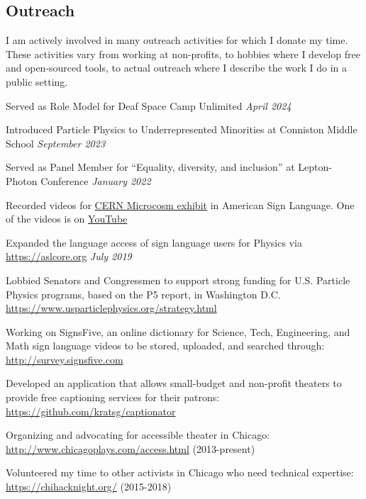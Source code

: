 \documentclass[margin,line]{resume}
\let\origsection\section%
\let\section\subsection%
\let\section\origsection%
\begin{document}
\begin{resume}
\section{\mysidestyle Outreach}
I am actively involved in many outreach activities for which I donate my time. These activities vary from working at non-profits, to hobbies where I develop free and open-sourced tools, to actual outreach where I describe the work I do in a public setting.
\begin{list2}
  \item Served as Role Model for Deaf Space Camp Unlimited \hfill \textsl{April 2024}
  \item Introduced Particle Physics to Underrepresented Minorities at Conniston Middle School \hfill \textsl{September 2023}
  \item Served as Panel Member for ``Equality, diversity, and inclusion'' at Lepton-Photon Conference \hfill \textsl{January 2022}
  \item Recorded videos for \href{https://microcosm.web.cern.ch/en}{CERN Microcosm exhibit} in American Sign Language. One of the videos is on \href{https://www.youtube.com/watch?v=BaGjAruqFec}{YouTube}
  \item Expanded the language access of sign language users for Physics via \url{https://aslcore.org} \hfill \textsl{July 2019}
  \item Lobbied Senators and Congressmen to support strong funding for U.S. Particle Physics programs, based on the P5 report, in Washington D.C. \url{https://www.usparticlephysics.org/strategy.html}
  \item Working on SignsFive, an online dictionary for Science, Tech, Engineering, and Math sign language videos to be stored, uploaded, and searched through: \url{http://survey.signsfive.com}
  \item Developed an application that allows small-budget and non-profit theaters to provide free captioning services for their patrons: \url{https://github.com/kratsg/captionator}
  \item Organizing and advocating for accessible theater in Chicago: \url{http://www.chicagoplays.com/access.html} (2013-present)
  \item Volunteered my time to other activists in Chicago who need technical expertise: \url{https://chihacknight.org/} (2015-2018)
\end{list2}


\end{resume}
\end{document}
